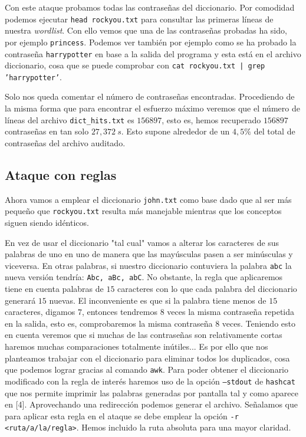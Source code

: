 \documentclass{article}
\begin{document}
            Con este ataque probamos todas las contraseñas del diccionario. Por comodidad podemos ejecutar \texttt{head rockyou.txt} para consultar las primeras líneas de nuestra \textit{wordlist}. Con ello vemos que una de las contraseñas probadas ha sido, por ejemplo \texttt{princess}. Podemos ver también por ejemplo como se ha probado la contraseña \texttt{harrypotter} en base a la salida del programa y esta está en el archivo diccionario, cosa que se puede comprobar con \texttt{cat rockyou.txt | grep 'harrypotter'}.

            Solo nos queda comentar el número de contraseñas encontradas. Procediendo de la misma forma que para encontrar el esfuerzo máximo veremos que el número de líneas del archivo \texttt{dict\_hits.txt} es $156897$, esto es, hemos recuperado $156897$ contraseñas en tan solo $27,372\ s$. Esto supone alrededor de un $4,5\%$ del total de contraseñas del archivo auditado.

        \subsection{Ataque con reglas}
            Ahora vamos a emplear el diccionario \texttt{john.txt} como base dado que al ser más pequeño que \texttt{rockyou.txt} resulta más manejable mientras que los conceptos siguen siendo idénticos.

            En vez de usar el diccionario "tal cual" vamos a alterar los caracteres de sus palabras de uno en uno de manera que las mayúsculas pasen a ser minúsculas y viceversa. En otras palabras, si nuestro diccionario contuviera la palabra \texttt{abc} la nueva versión tendría: \texttt{Abc, aBc, abC}. No obstante, la regla que aplicaremos tiene en cuenta palabras de $15$ caracteres con lo que cada palabra del diccionario generará $15$ nuevas. El inconveniente es que si la palabra tiene menos de $15$ caracteres, digamos $7$, entonces tendremos $8$ veces la misma contraseña repetida en la salida, esto es, comprobaremos la misma contraseña $8$ veces. Teniendo esto en cuenta veremos que si muchas de las contraseñas son relativamente cortas haremos muchas comparaciones totalmente inútiles... Es por ello que nos planteamos trabajar con el diccionario para eliminar todos los duplicados, cosa que podemos lograr gracias al comando \texttt{awk}. Para poder obtener el diccionario modificado con la regla de interés haremos uso de la opción \texttt{--stdout} de \texttt{hashcat} que nos permite imprimir las palabras generadas por pantalla tal y como aparece en [4]. Aprovechando una redirección podemos generar el archivo. Señalamos que para aplicar esta regla en el ataque se debe emplear la opción \texttt{-r <ruta/a/la/regla>}. Hemos incluido la ruta absoluta para una mayor claridad.
\end{document}
